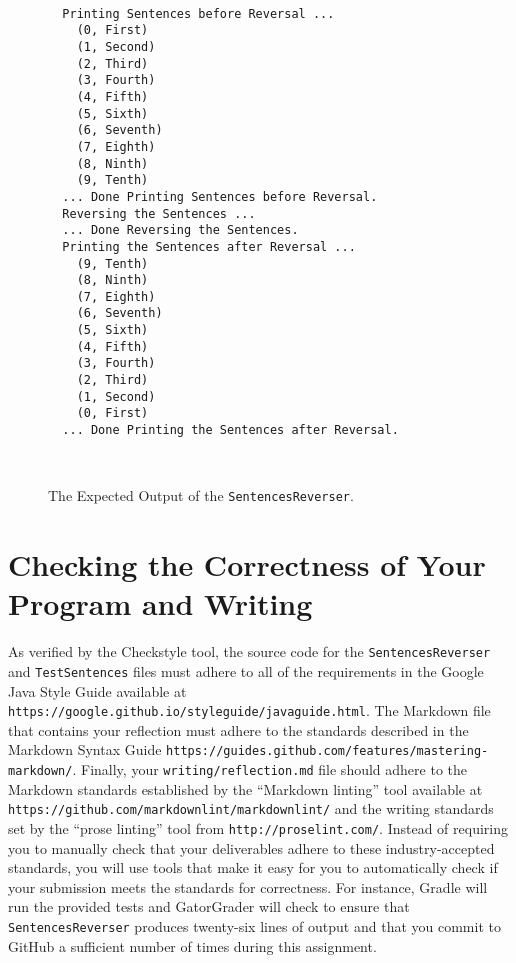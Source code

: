 \documentclass[11pt]{article}
\newcommand{\mainprogram}{\lstinline{SentencesReverser}}
\newcommand{\testprogram}{\lstinline{TestSentences}}
\newcommand{\reflection}{\lstinline{writing/reflection.md}}
\newcommand{\url}[1]{\lstinline{#1}}
\newcommand{\step}[1]{``{#1}''}
\begin{document}
\begin{figure}[t]
  \centering

  \begin{verbatim}

  Printing Sentences before Reversal ...
    (0, First)
    (1, Second)
    (2, Third)
    (3, Fourth)
    (4, Fifth)
    (5, Sixth)
    (6, Seventh)
    (7, Eighth)
    (8, Ninth)
    (9, Tenth)
  ... Done Printing Sentences before Reversal.
  Reversing the Sentences ...
  ... Done Reversing the Sentences.
  Printing the Sentences after Reversal ...
    (9, Tenth)
    (8, Ninth)
    (7, Eighth)
    (6, Seventh)
    (5, Sixth)
    (4, Fifth)
    (3, Fourth)
    (2, Third)
    (1, Second)
    (0, First)
  ... Done Printing the Sentences after Reversal.

  \end{verbatim}
  \vspace*{-.5in}
  \caption{The Expected Output of the \mainprogram{}.}~\label{fig:output}
  \vspace*{-.25in}
\end{figure}

\section*{Checking the Correctness of Your Program and Writing}

As verified by the Checkstyle tool, the source code for the \mainprogram{} and
\testprogram{} files must adhere to all of the requirements in the Google Java
Style Guide available at
\url{https://google.github.io/styleguide/javaguide.html}. The Markdown file
that contains your reflection must adhere to the standards described in the
Markdown Syntax Guide
\url{https://guides.github.com/features/mastering-markdown/}. Finally, your
\reflection{} file should adhere to the Markdown standards established by the
\step{Markdown linting} tool available at
\url{https://github.com/markdownlint/markdownlint/} and the writing standards
set by the \step{prose linting} tool from \url{http://proselint.com/}. Instead
of requiring you to manually check that your deliverables adhere to these
industry-accepted standards, you will use tools that make it easy for you to
automatically check if your submission meets the standards for correctness. For
instance, Gradle will run the provided tests and GatorGrader will check to
ensure that \mainprogram{} produces twenty-six lines of output and that you
commit to GitHub a sufficient number of times during this assignment.
\end{document}
